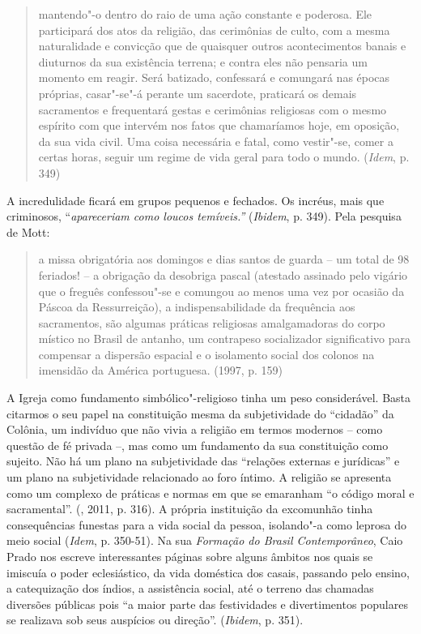 \begin{quote}
mantendo"-o dentro do raio de uma ação constante e poderosa. Ele
participará dos atos da religião, das cerimônias de culto, com a mesma
naturalidade e convicção que de quaisquer outros acontecimentos banais e
diuturnos da sua existência terrena; e contra eles não pensaria um
momento em reagir. Será batizado, confessará e comungará nas épocas
próprias, casar"-se"-á perante um sacerdote, praticará os demais
sacramentos e frequentará gestas e cerimônias religiosas com o mesmo
espírito com que intervém nos fatos que chamaríamos hoje, em oposição,
da sua vida civil. Uma coisa necessária e fatal, como vestir"-se, comer a
certas horas, seguir um regime de vida geral para todo o mundo.
(\emph{Idem}, p. 349)
\end{quote}

A incredulidade ficará em grupos pequenos e fechados. Os incréus, mais
que criminosos, ``\emph{apareceriam como loucos
temíveis.''} (\emph{Ibidem}, p. 349). Pela pesquisa de Mott:

\begin{quote}
a missa obrigatória aos domingos e dias santos de guarda -- um total de
98 feriados! -- a obrigação da desobriga pascal (atestado assinado pelo
vigário que o freguês confessou"-se e comungou ao menos uma vez por
ocasião da Páscoa da Ressurreição), a indispensabilidade da frequência
aos sacramentos, são algumas práticas religiosas amalgamadoras do corpo
místico no Brasil de antanho, um contrapeso socializador significativo
para compensar a dispersão espacial e o isolamento social dos colonos na
imensidão da América portuguesa. (1997, p. 159)
\end{quote}

A Igreja como fundamento simbólico"-religioso tinha um peso considerável.
Basta citarmos o seu papel na constituição mesma da subjetividade do
``cidadão'' da Colônia, um indivíduo que não vivia a religião em termos
modernos -- como questão de fé privada --, mas como um fundamento da sua
constituição como sujeito. Não há um plano na subjetividade das
``relações externas e jurídicas'' e um plano na subjetividade
relacionado ao foro íntimo. A religião se apresenta como um complexo de
práticas e normas em que se emaranham ``o código moral e sacramental''.
(, 2011, p. 316). A própria instituição da excomunhão tinha
consequências funestas para a vida social da pessoa, isolando"-a como
leprosa do meio social (\emph{Idem}, p. 350-51). Na sua \emph{Formação
do Brasil Contemporâneo}, Caio Prado nos escreve interessantes páginas
sobre alguns âmbitos nos quais se imiscuía o poder eclesiástico, da vida
doméstica dos casais, passando pelo ensino, a catequização dos índios, a
assistência social, até o terreno das chamadas diversões públicas pois
``a maior parte das festividades e divertimentos populares se realizava
sob seus auspícios ou direção''. (\emph{Ibidem}, p. 351).

